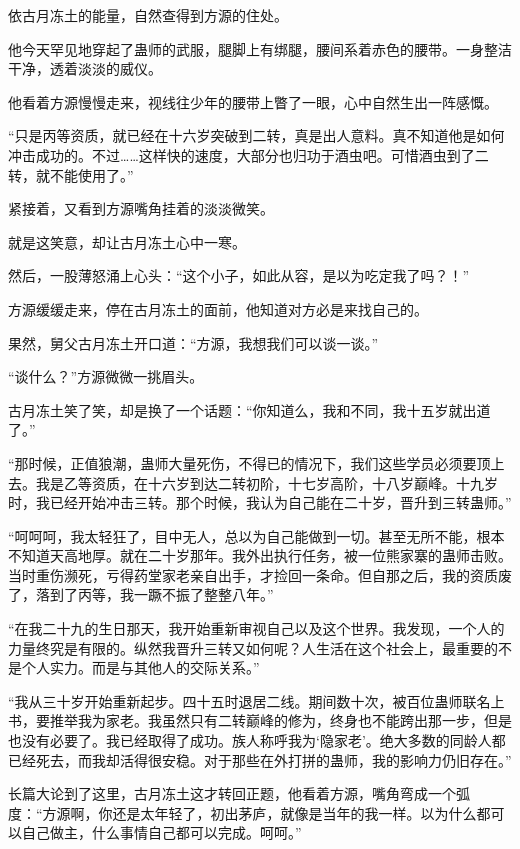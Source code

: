 
\begin{this_body}



依古月冻土的能量，自然查得到方源的住处。

他今天罕见地穿起了蛊师的武服，腿脚上有绑腿，腰间系着赤色的腰带。一身整洁干净，透着淡淡的威仪。

他看着方源慢慢走来，视线往少年的腰带上瞥了一眼，心中自然生出一阵感慨。

“只是丙等资质，就已经在十六岁突破到二转，真是出人意料。真不知道他是如何冲击成功的。不过……这样快的速度，大部分也归功于酒虫吧。可惜酒虫到了二转，就不能使用了。”

紧接着，又看到方源嘴角挂着的淡淡微笑。

就是这笑意，却让古月冻土心中一寒。

然后，一股薄怒涌上心头：“这个小子，如此从容，是以为吃定我了吗？！”

方源缓缓走来，停在古月冻土的面前，他知道对方必是来找自己的。

果然，舅父古月冻土开口道：“方源，我想我们可以谈一谈。”

“谈什么？”方源微微一挑眉头。

古月冻土笑了笑，却是换了一个话题：“你知道么，我和不同，我十五岁就出道了。”

“那时候，正值狼潮，蛊师大量死伤，不得已的情况下，我们这些学员必须要顶上去。我是乙等资质，在十六岁到达二转初阶，十七岁高阶，十八岁巅峰。十九岁时，我已经开始冲击三转。那个时候，我认为自己能在二十岁，晋升到三转蛊师。”

“呵呵呵，我太轻狂了，目中无人，总以为自己能做到一切。甚至无所不能，根本不知道天高地厚。就在二十岁那年。我外出执行任务，被一位熊家寨的蛊师击败。当时重伤濒死，亏得药堂家老亲自出手，才捡回一条命。但自那之后，我的资质废了，落到了丙等，我一蹶不振了整整八年。”

“在我二十九的生日那天，我开始重新审视自己以及这个世界。我发现，一个人的力量终究是有限的。纵然我晋升三转又如何呢？人生活在这个社会上，最重要的不是个人实力。而是与其他人的交际关系。”

“我从三十岁开始重新起步。四十五时退居二线。期间数十次，被百位蛊师联名上书，要推举我为家老。我虽然只有二转巅峰的修为，终身也不能跨出那一步，但是也没有必要了。我已经取得了成功。族人称呼我为‘隐家老’。绝大多数的同龄人都已经死去，而我却活得很安稳。对于那些在外打拼的蛊师，我的影响力仍旧存在。”

长篇大论到了这里，古月冻土这才转回正题，他看着方源，嘴角弯成一个弧度：“方源啊，你还是太年轻了，初出茅庐，就像是当年的我一样。以为什么都可以自己做主，什么事情自己都可以完成。呵呵。”


\end{this_body}

